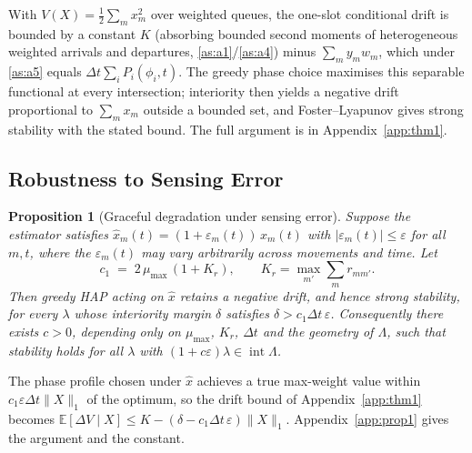 \documentclass[journal]{IEEEtran}
\newtheorem{proposition}{Proposition}
\begin{document}
\begin{IEEEproof}
With $V(X)=\tfrac12\sum_m x_m^2$ over weighted queues, the one-slot
conditional drift is bounded by a constant $K$ (absorbing bounded second
moments of heterogeneous weighted arrivals and departures,
\ref{as:a1}/\ref{as:a4}) minus $\sum_m y_m w_m$, which under
\ref{as:a5} equals $\Delta t \sum_i P_i(\phi_i,t)$. The greedy phase
choice maximises this separable functional at every intersection;
interiority then yields a negative drift proportional to $\sum_m x_m$
outside a bounded set, and Foster--Lyapunov gives strong stability with
the stated bound. The full argument is in Appendix~\ref{app:thm1}.
\end{IEEEproof}

\subsection{Robustness to Sensing Error}

\begin{proposition}[Graceful degradation under sensing error]
\label{prop:robust}
Suppose the estimator satisfies
$\hat{x}_m(t) = (1+\varepsilon_m(t))\,x_m(t)$ with
$|\varepsilon_m(t)| \le \varepsilon$ for all $m,t$, where the
$\varepsilon_m(t)$ may vary arbitrarily across movements and time. Let
\begin{equation}
c_1 \;=\; 2\,\mu_{\max}\,(1+K_r), \qquad
K_r = \max_{m'} \sum_m r_{mm'} .
\label{eq:c1}
\end{equation}
Then greedy HAP acting on $\hat{x}$ retains a negative drift, and hence
strong stability, for every $\lambda$ whose interiority margin $\delta$
satisfies $\delta > c_1 \Delta t\, \varepsilon$. Consequently there
exists $c>0$, depending only on $\mu_{\max}$, $K_r$, $\Delta t$ and the
geometry of $\Lambda$, such that stability holds for all $\lambda$ with
$(1+c\varepsilon)\lambda \in \operatorname{int}\Lambda$.
\end{proposition}

\begin{IEEEproof}
The phase profile chosen under $\hat{x}$ achieves a true max-weight value
within $c_1 \varepsilon \Delta t \|X\|_1$ of the optimum, so the drift
bound of Appendix~\ref{app:thm1} becomes
$\mathbb{E}[\Delta V \mid X] \le K - (\delta - c_1\Delta t\,\varepsilon)
\|X\|_1$. Appendix~\ref{app:prop1} gives the argument and the constant.
\end{IEEEproof}
\end{document}
